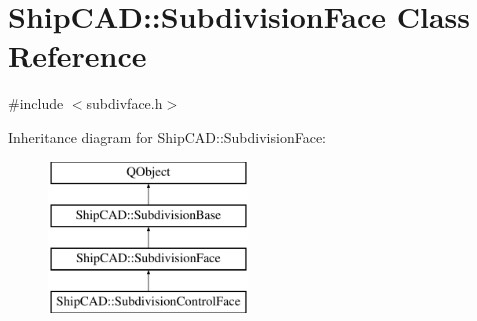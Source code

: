 \hypertarget{classShipCAD_1_1SubdivisionFace}{\section{Ship\-C\-A\-D\-:\-:Subdivision\-Face Class Reference}
\label{classShipCAD_1_1SubdivisionFace}
}


{\ttfamily \#include $<$subdivface.\-h$>$}

Inheritance diagram for Ship\-C\-A\-D\-:\-:Subdivision\-Face\-:\begin{figure}[H]
\begin{center}
\leavevmode
\includegraphics[height=4.000000cm]{classShipCAD_1_1SubdivisionFace}
\end{center}
\end{figure}
